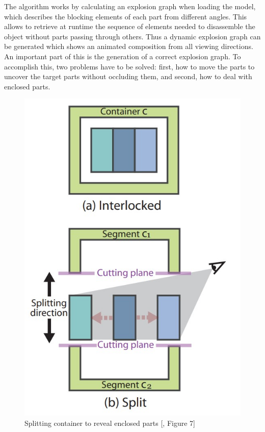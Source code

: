 The algorithm works by calculating an explosion graph when loading the model, which describes the blocking elements of each part from different angles. 
This allows to retrieve at runtime the sequence of elements needed to disassemble the object without parts passing through others. 
Thus a dynamic explosion graph can be generated which shows an animated composition from all viewing directions.
An important part of this is the generation of a correct explosion graph. 
To accomplish this, two problems have to be solved: first, how to move the parts to uncover the target parts without occluding them, and second, how to deal with enclosed parts. 
\begin{figure}
	\centering
	\vspace{-0.4cm}
	\includegraphics[width=1\linewidth]{fig/Images/AutomatedGenerationofInteractive3DExplodedViewDiagrams_Li2008_fig7}
	\caption[]{Splitting container to reveal enclosed parts [\cite{Wilmot_Li_2008}, Figure 7]}
	\vspace{-0.8cm}
\end{figure}
